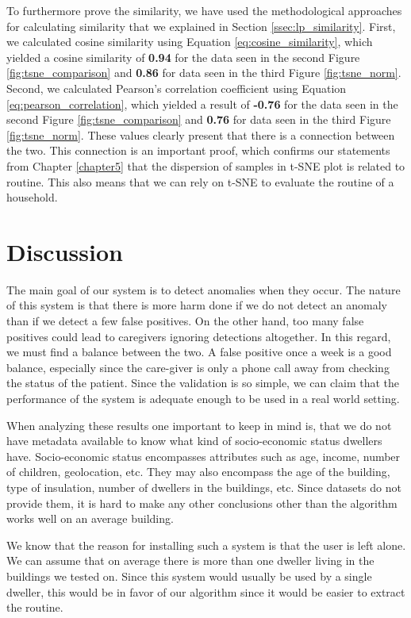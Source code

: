 To furthermore prove the similarity, we have used the methodological approaches for calculating similarity that we explained in Section \ref{ssec:lp_similarity}.
First, we calculated cosine similarity using Equation \ref{eq:cosine_similarity}, which yielded a cosine similarity of \textbf{0.94}  for the data seen in the second Figure \ref{fig:tsne_comparison} and \textbf{0.86} for data seen in the third Figure \ref{fig:tsne_norm}.
Second, we calculated Pearson's correlation coefficient using Equation \ref{eq:pearson_correlation}, which yielded a result of \textbf{-0.76} for the data seen in the second Figure \ref{fig:tsne_comparison} and \textbf{0.76} for data seen in the third Figure \ref{fig:tsne_norm}.
These values clearly present that there is a connection between the two.
This connection is an important proof, which confirms our statements from Chapter \ref{chapter5} that the dispersion of samples in t-SNE plot is related to routine.
This also means that we can rely on t-SNE to evaluate the routine of a household.

\section{Discussion}

The main goal of our system is to detect anomalies when they occur. 
The nature of this system is that there is more harm done if we do not detect an anomaly than if we detect a few false positives. 
On the other hand, too many false positives could lead to caregivers ignoring detections altogether.
In this regard, we must find a balance between the two.
A false positive once a week is a good balance, especially since the care-giver is only a phone call away from checking the status of the patient.
Since the validation is so simple, we can claim that the performance of the system is adequate enough to be used in a real world setting.

When analyzing these results one important to keep in mind is,
that we do not have metadata available to know what kind of socio-economic status dwellers have.
Socio-economic status encompasses attributes such as age, income, number of children, geolocation, etc.
They may also encompass the age of the building, type of insulation, number of dwellers in the buildings, etc.
Since datasets do not provide them, it is hard to make any other conclusions other than the algorithm works well on an average building.

We know that the reason for installing such a system is that the user is left alone.
We can assume that on average there is more than one dweller living in the buildings we tested on.
Since this system would usually be used by a single dweller,
this would be in favor of our algorithm since it would be 
easier to extract the routine.

